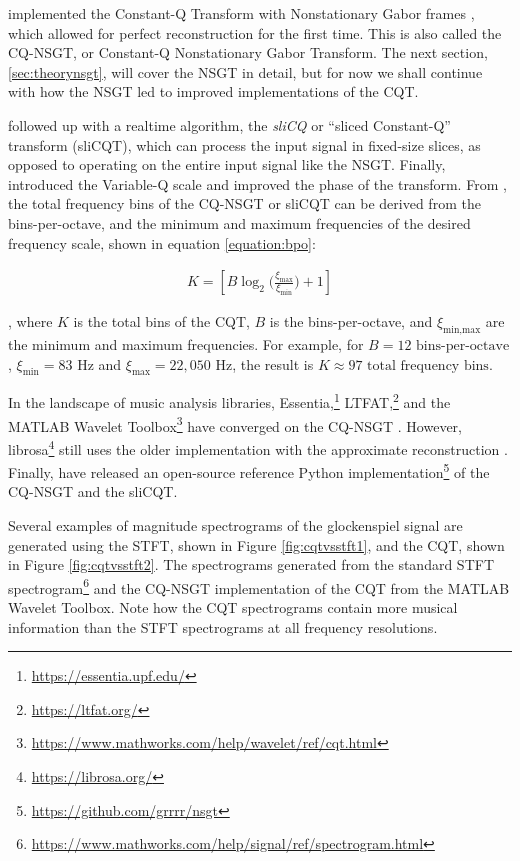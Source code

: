 \documentclass[report.tex]{subfiles}
\begin{document}
\textcite{invertiblecqt} implemented the Constant-Q Transform with Nonstationary Gabor frames \parencite{balazs}, which allowed for perfect reconstruction for the first time. This is also called the CQ-NSGT, or Constant-Q Nonstationary Gabor Transform. The next section, \ref{sec:theorynsgt}, will cover the NSGT in detail, but for now we shall continue with how the NSGT led to improved implementations of the CQT.

\textcite{slicq} followed up with a realtime algorithm, the \textit{sliCQ} or ``sliced Constant-Q'' transform (sliCQT), which can process the input signal in fixed-size slices, as opposed to operating on the entire input signal like the NSGT. Finally, \textcite{variableq1} introduced the Variable-Q scale and improved the phase of the transform. From \textcite{invertiblecqt}, the total frequency bins of the CQ-NSGT or sliCQT can be derived from the bins-per-octave, and the minimum and maximum frequencies of the desired frequency scale, shown in equation \ref{equation:bpo}:

\begin{align}
	K = [B \log_{2}\big(\frac{\xi_{\text{max}}}{\xi_{\text{min}}}\big) + 1]\tag{10}\label{equation:bpo}
\end{align}

, where $K$ is the total bins of the CQT, $B$ is the bins-per-octave, and $\xi_{\text{min,max}}$ are the minimum and maximum frequencies. For example, for $B = 12 \text{ bins-per-octave}$, $\xi_{\text{min}} = 83 \text{ Hz}$ and $\xi_{\text{max}} = 22{,}050 \text{ Hz}$, the result is $K \approx 97 \text{ total frequency bins}$.

In the landscape of music analysis libraries, Essentia,\footnote{\url{https://essentia.upf.edu/}} LTFAT,\footnote{\url{https://ltfat.org/}} and the MATLAB Wavelet Toolbox\footnote{\url{https://www.mathworks.com/help/wavelet/ref/cqt.html}} have converged on the CQ-NSGT \parencite{invertiblecqt, slicq, variableq1}. However, librosa\footnote{\url{https://librosa.org/}} still uses the older implementation with the approximate reconstruction \parencite{klapuricqt}. Finally, \textcite{invertiblecqt} have released an open-source reference Python implementation\footnote{\url{https://github.com/grrrr/nsgt}} of the CQ-NSGT and the sliCQT.

Several examples of magnitude spectrograms of the glockenspiel signal are generated using the STFT, shown in Figure \ref{fig:cqtvsstft1}, and the CQT, shown in Figure \ref{fig:cqtvsstft2}. The spectrograms generated from the standard STFT spectrogram\footnote{\url{https://www.mathworks.com/help/signal/ref/spectrogram.html}} and the CQ-NSGT implementation of the CQT from the MATLAB Wavelet Toolbox. Note how the CQT spectrograms contain more musical information than the STFT spectrograms at all frequency resolutions.
\end{document}
